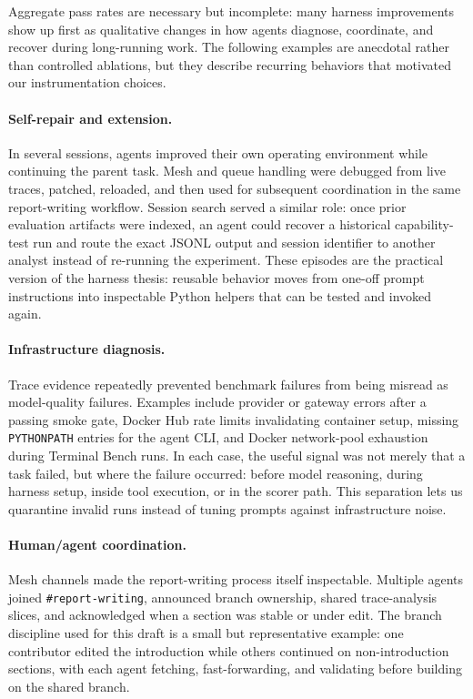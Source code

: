 \documentclass[11pt, logo, onecolumn, copyright, colorlinks=true, allcolors=blue]{nvidiatechreport}
\begin{document}
Aggregate pass rates are necessary but incomplete: many harness improvements
show up first as qualitative changes in how agents diagnose, coordinate, and
recover during long-running work. The following examples are anecdotal rather
than controlled ablations, but they describe recurring behaviors that motivated
our instrumentation choices.

\paragraph{Self-repair and extension.} In several sessions, agents improved
their own operating environment while continuing the parent task. Mesh and
queue handling were debugged from live traces, patched, reloaded, and then used
for subsequent coordination in the same report-writing workflow. Session search
served a similar role: once prior evaluation artifacts were indexed, an agent
could recover a historical capability-test run and route the exact JSONL output
and session identifier to another analyst instead of re-running the experiment.
These episodes are the practical version of the harness thesis: reusable
behavior moves from one-off prompt instructions into inspectable Python helpers
that can be tested and invoked again.

\paragraph{Infrastructure diagnosis.} Trace evidence repeatedly prevented
benchmark failures from being misread as model-quality failures. Examples
include provider or gateway errors after a passing smoke gate, Docker Hub rate
limits invalidating container setup, missing \texttt{PYTHONPATH} entries for the
agent CLI, and Docker network-pool exhaustion during Terminal Bench runs. In
each case, the useful signal was not merely that a task failed, but where the
failure occurred: before model reasoning, during harness setup, inside tool
execution, or in the scorer path. This separation lets us quarantine invalid
runs instead of tuning prompts against infrastructure noise.

\paragraph{Human/agent coordination.} Mesh channels made the report-writing
process itself inspectable. Multiple agents joined \texttt{\#report-writing},
announced branch ownership, shared trace-analysis slices, and acknowledged when
a section was stable or under edit. The branch discipline used for this draft is
a small but representative example: one contributor edited the introduction
while others continued on non-introduction sections, with each agent fetching,
fast-forwarding, and validating before building on the shared branch.
\end{document}
